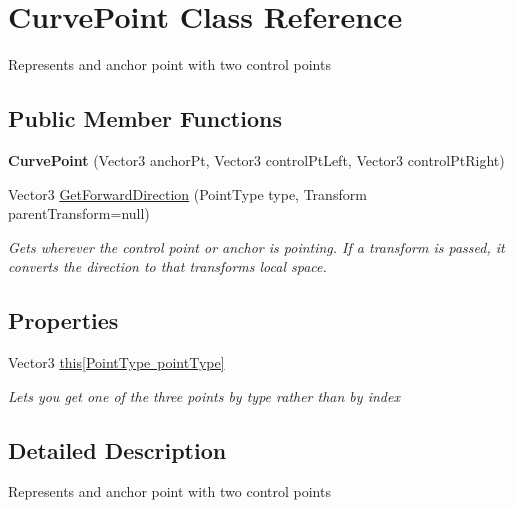 \hypertarget{class_curve_point}{}\section{Curve\+Point Class Reference}
\label{class_curve_point}


Represents and anchor point with two control points  


\subsection*{Public Member Functions}
\begin{DoxyCompactItemize}
\item 
\mbox{\label{class_curve_point_ad10e03f3be123211310318ed71a77962}} 
{\bfseries Curve\+Point} (Vector3 anchor\+Pt, Vector3 control\+Pt\+Left, Vector3 control\+Pt\+Right)
\item 
Vector3 \mbox{\hyperlink{class_curve_point_a1d347d73350bdc47a71c17f030507d7f}{Get\+Forward\+Direction}} (Point\+Type type, Transform parent\+Transform=null)
\begin{DoxyCompactList}\small\item\em Gets wherever the control point or anchor is pointing. If a transform is passed, it converts the direction to that transform\textquotesingle{}s local space. \end{DoxyCompactList}\end{DoxyCompactItemize}
\subsection*{Properties}
\begin{DoxyCompactItemize}
\item 
Vector3 \mbox{\hyperlink{class_curve_point_a4770bc5efb8c44892b8216d3a12b645a}{this\mbox{[}\+Point\+Type point\+Type\mbox{]}}}
\begin{DoxyCompactList}\small\item\em Lets you get one of the three points by type rather than by index \end{DoxyCompactList}\end{DoxyCompactItemize}


\subsection{Detailed Description}
Represents and anchor point with two control points 



